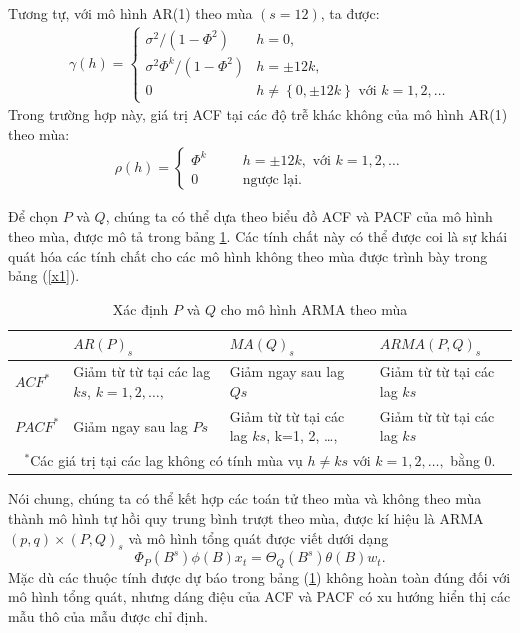 \documentclass[12pt, a4paper,oneside]{book}
\theoremstyle{definition}
\begin{document}
Tương tự, với mô hình AR(1) theo mùa $(s=12)$, ta được:
\begin{align*}
\gamma(h)=
\begin{cases} 
\sigma^{2} / (1-\Phi^{2})& h=0,\\
\sigma^{2}\Phi^{k} / (1-\Phi^{2})& h=\pm12k,\\
0 \hspace{1cm}& h\neq\left\lbrace 0, \pm 12k\right\rbrace \text{ với } k=1, 2, \dots
\end{cases}
\end{align*}
Trong trường hợp này, giá trị ACF tại các độ trễ khác không của mô hình AR(1) theo mùa:
\begin{align}
\rho(h)=
\begin{cases} 
\Phi^{k}& h=\pm12k,\text{ với } k=1, 2, \dots \\
0 \hspace{1cm}& \text{ngược lại.} 
\end{cases}
\end{align}

Để chọn $P$ và $Q$, chúng ta có thể dựa theo biểu đồ ACF và PACF của mô hình theo mùa, được mô tả trong bảng \ref{b2}. Các tính chất này có thể được coi là sự khái quát hóa các tính chất cho các mô hình không theo mùa được trình bày trong bảng (\ref{x1}).
\begin{table}[h!]
	\caption{Xác định $P$ và $Q$ cho mô hình ARMA theo mùa}
	\label{b2} 
	\centering
	\begin{tabular}{|p{3cm}|p{4cm}|p{4cm}|p{4cm}|}
		\hline 
		&$AR(P)_s$ &$MA(Q)_s$ &$ARMA(P,Q)_s$ \\
		\hline 
		$ACF^{*}$ &Giảm từ từ tại các lag $ks$, $k=1, 2, \dots,$ &Giảm ngay sau lag $Qs$ & Giảm từ từ tại các lag $ks$\\
		\hline 
		$PACF^{*}$ &Giảm ngay sau lag $Ps$ & Giảm từ từ tại các lag $ks$, k=1, 2, \dots, & Giảm từ từ tại các lag $ks$ \\
		\hline 
		\multicolumn{4}{c}{$^{*}$Các giá trị tại các lag không có tính mùa vụ $h\neq ks$ với $k=1, 2, \dots,$ bằng $0$.}\\
		\hline 
	\end{tabular}
\end{table}

Nói chung, chúng ta có thể kết hợp các toán tử theo mùa và không theo mùa thành mô hình tự hồi quy trung bình trượt theo mùa, được kí hiệu là ARMA$(p, q)\times(P, Q)_s$ và mô hình tổng quát được viết dưới dạng
\begin{equation}
\Phi_ {P} (B^{s})\phi(B)x_{t}= \varTheta_{Q}(B^{s})\theta(B)w_{t}. \label{ct1.196}
\end{equation}
Mặc dù các thuộc tính được dự báo trong bảng (\ref{b2}) không hoàn toàn đúng đối với mô hình tổng quát, nhưng dáng điệu của ACF và PACF có xu hướng hiển thị các mẫu thô của mẫu được chỉ định.
\end{document}
